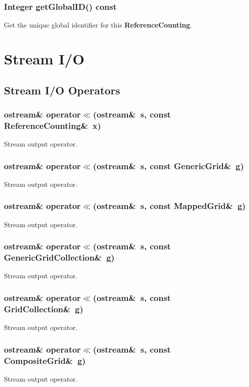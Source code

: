 \documentclass{article}
\begin{document}
  \subsubsection{Integer getGlobalID() const}
  \label{ReferenceCounting::getGlobalID() const}
    Get the unique global identifier for this \textbf{ReferenceCounting}.

\section{Stream I/O}
\label{IOStream}

\subsection{Stream I/O Operators}
\label{IOStream::Operators}

  \subsubsection{ostream\& operator$\ll$(ostream\&~s, const ReferenceCounting\&~x)}
  \label{IOStream::operator<<(s,ReferenceCounting_x)}
    Stream output operator.

  \subsubsection{ostream\& operator$\ll$(ostream\&~s, const GenericGrid\&~g)}
  \label{IOStream::operator<<(s,GenericGrid_g)}
    Stream output operator.

  \subsubsection{ostream\& operator$\ll$(ostream\&~s, const MappedGrid\&~g)}
  \label{IOStream::operator<<(s,MappedGrid_g)}
    Stream output operator.

  \subsubsection{ostream\& operator$\ll$(ostream\&~s, const GenericGridCollection\&~g)}
  \label{IOStream::operator<<(s,GenericGridCollection_g)}
    Stream output operator.

  \subsubsection{ostream\& operator$\ll$(ostream\&~s, const GridCollection\&~g)}
  \label{IOStream::operator<<(s,GridCollection_g)}
    Stream output operator.

  \subsubsection{ostream\& operator$\ll$(ostream\&~s, const CompositeGrid\&~g)}
  \label{IOStream::operator<<(s,CompositeGrid_g)}
    Stream output operator.


\printindex
\end{document}
